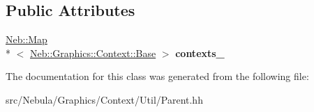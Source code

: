 \subsection*{Public Attributes}
\begin{DoxyCompactItemize}
\item 
\hypertarget{classNeb_1_1Graphics_1_1Context_1_1Util_1_1Parent_a72f33aa536f341ea2fe4e919616c4367}{\hyperlink{classNeb_1_1Map}{Neb\-::\-Map}\\*
$<$ \hyperlink{classNeb_1_1Graphics_1_1Context_1_1Base}{Neb\-::\-Graphics\-::\-Context\-::\-Base} $>$ {\bfseries contexts\-\_\-}}\label{classNeb_1_1Graphics_1_1Context_1_1Util_1_1Parent_a72f33aa536f341ea2fe4e919616c4367}

\end{DoxyCompactItemize}


The documentation for this class was generated from the following file\-:\begin{DoxyCompactItemize}
\item 
src/\-Nebula/\-Graphics/\-Context/\-Util/Parent.\-hh\end{DoxyCompactItemize}
